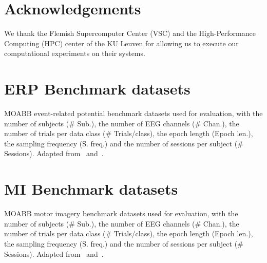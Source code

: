 \documentclass[twocolumn]{article}
\begin{document}
\section*{Acknowledgements}
We thank the Flemish Supercomputer Center (VSC) and the High-Performance
Computing (HPC) center of the KU Leuven for allowing us to execute our
computational experiments on their systems.

\clearpage
\appendix

\onecolumn
{}
\section{ERP Benchmark datasets}
\begin{table*}[htp]
  
  \caption{MOABB event-related potential benchmark datasets used for evaluation, with the number of
  subjects (\# Sub.), the number of EEG channels (\# Chan.), the number of trials
per data class (\# Trials/class), the epoch length (Epoch len.), the sampling
frequency (S. freq.) and the number of sessions per subject (\# Sessions).
Adapted from~\cite{Aristimunha2023} and~\cite{Chevallier2024}.}
  \label{tab:moabb-erp}
\end{table*}

\section{MI Benchmark datasets}
\begin{table*}[htp]
  \caption{MOABB motor imagery benchmark datasets used for evaluation, with the number of
  subjects (\# Sub.), the number of EEG channels (\# Chan.), the number of trials
per data class (\# Trials/class), the epoch length (Epoch len.), the sampling
frequency (S. freq.) and the number of sessions per subject (\# Sessions).
Adapted from~\cite{Aristimunha2023} and~\cite{Chevallier2024}.}
  \label{tab:moabb-mi}
\end{table*}
\end{document}
